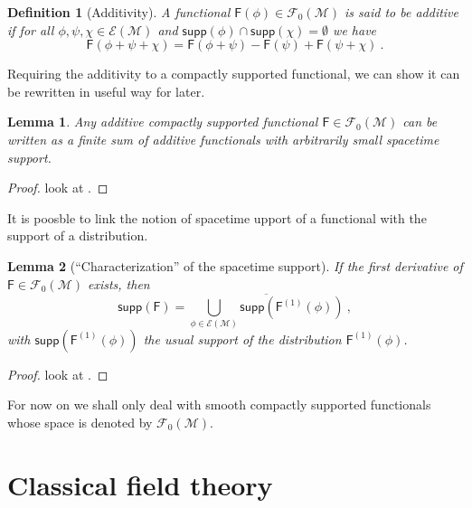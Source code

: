 \documentclass[10pt]{book}
\newcommand{\supp}{\mathsf{supp}}
\newcommand{\Ecal}{\mathcal{E}}
\newcommand{\Fcal}{\mathcal{F}}
\newcommand{\Mcal}{\mathcal{M}}
\newcommand{\Fsf}{\mathsf{F}}
\theoremstyle{break}
\newtheorem{lemma}{Lemma}
\newtheorem{definition}{Definition}
\begin{document}
\bigskip


\begin{definition}[Additivity]
A functional $\Fsf(\phi) \in \Fcal_0(\Mcal)$ is said to be additive if for all $\phi, \psi, \chi \in \Ecal(\Mcal)$ and $\supp(\phi) \cap \supp(\chi) = \emptyset$ we have 
%
\begin{equation*}
\Fsf(\phi + \psi + \chi) = \Fsf(\phi + \psi) - \Fsf(\psi) + \Fsf(\psi + \chi) \ . 
\end{equation*}
%
\end{definition}


Requiring the additivity to a compactly supported functional, we can show it can be rewritten in useful way for later.


\begin{lemma}
Any additive compactly supported  functional $\Fsf \in \Fcal_0(\Mcal)$ can be written as a finite sum of additive functionals with arbitrarily small spacetime support.
\end{lemma}


\begin{proof}
look at \cite[lemma 2.3.5]{brunetti_algebraic_2012}. 
\end{proof}


It is poosble to link the notion of spacetime upport of a functional with the support of a distribution.


\begin{lemma}[``Characterization'' of the spacetime support]
If the first derivative of $\Fsf\in\Fcal_0(\Mcal)$ exists, then
%
\begin{equation*}
\supp\left(\Fsf\right) = \overline{\bigcup_{\phi\in\Ecal(\Mcal)} \supp\left(\Fsf^{(1)}(\phi)\right)} \ ,
\end{equation*}
%
with $\supp\left(\Fsf^{(1)}(\phi)\right)$ the usual support of the distribution $\Fsf^{(1)}(\phi)$.
\end{lemma}


\begin{proof}
look at \cite[lemma 2.3.5]{brunetti_algebraic_2012}. 
\end{proof}


For now on we shall only deal with smooth compactly supported functionals whose space is denoted by $\Fcal_0(\Mcal)$.


\section{Classical field theory}
\end{document}
